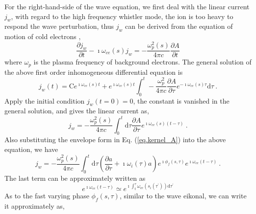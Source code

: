 For the right-hand-side of the wave equation, we first deal with the linear current $j_w$, with regard to the high frequency whistler mode, the ion is too heavy to respond the wave perturbation, thus $j_w$ can be derived from the equation of motion of cold electrons \cite{stix1992},
\begin{equation}
    \frac{\partial j_w}{\partial t}-\imath \omega_{c e}(s) j_w=-\frac{\omega_{p}^{2}(s)}{4 \pi c} \frac{\partial A}{\partial t}
\end{equation}
where $\omega_{p}$ is the plasma frequency of background electrons.
The general solution of the above first order inhomogeneous differential equation is
\begin{equation}
    j_w(t) = \mathrm{C} e^{\imath \omega_{ce}(s)t} + e^{\imath \omega_{ce}(s)t} \int_0^t - \frac{\omega_{p}^2}{4 \pi c} \frac{\partial A}{\partial \tau} e^{-\imath \omega_{ce}(s)\tau} \mathrm{d} \tau  ~.
\end{equation}
Apply the initial condition $j_w(t=0) = 0$, the constant is vanished in the general solution, and gives the linear current as,
\begin{equation}
    \label{eq.jw}
    j_w =-\frac{\omega_{p}^{2}(s)}{4 \pi c} \int_0^{t} \mathrm{d} \tau \frac{\partial A}{\partial \tau} e^{\imath \omega_{c e}(s)(t-\tau)}~.
\end{equation}
Also substituting the envelope form in Eq. (\ref{eq.kernel_A}) into the above equation, we have
\begin{equation}
    j_w = -\frac{\omega_p^2(s)}{4 \pi c}\int_0^t \mathrm{d} \tau \left(\frac{\partial a}{\partial \tau} + \imath \omega_i(\tau) a\right)e^{\imath \phi_f(s,\tau)} e^{\imath \omega_{ce}(t-\tau)}~.
\end{equation}
The last term can be approximately written as
\begin{equation}
    e^{\imath \omega_{ce}(t-\tau)} \simeq e^{\imath \int^\tau_t \omega_{ce}(s_i(\tau^\prime))\mathrm{d}\tau^\prime}
\end{equation}
As to the fast varying phase $\phi_f(s,\tau)$, similar to the wave eikonal, we can write it approximately as, 
